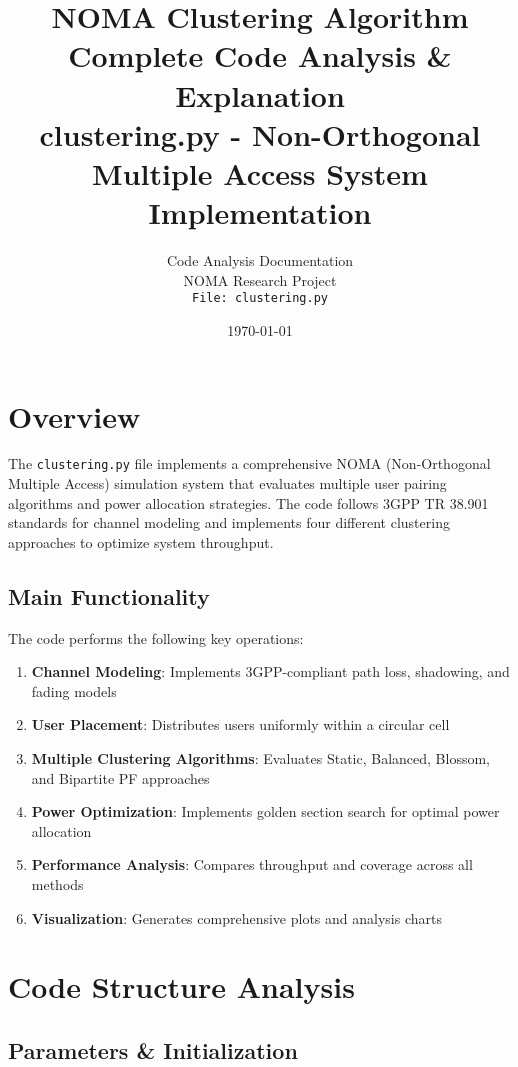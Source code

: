 \documentclass[11pt,a4paper]{article}
\title{
    {\Huge \textbf{NOMA Clustering Algorithm}} \\
    \vspace{0.5cm}
    {\Large Complete Code Analysis \& Explanation} \\
    \vspace{0.5cm}
    {\large clustering.py - Non-Orthogonal Multiple Access System Implementation}
}
\author{
    Code Analysis Documentation \\
    NOMA Research Project \\
    \texttt{File: clustering.py}
}
\date{\today}
\begin{document}
\maketitle
\newpage

\tableofcontents
\newpage

\section{Overview}

The \texttt{clustering.py} file implements a comprehensive NOMA (Non-Orthogonal Multiple Access) simulation system that evaluates multiple user pairing algorithms and power allocation strategies. The code follows 3GPP TR 38.901 standards for channel modeling and implements four different clustering approaches to optimize system throughput.

\subsection{Main Functionality}

The code performs the following key operations:

\begin{enumerate}
    \item \textbf{Channel Modeling}: Implements 3GPP-compliant path loss, shadowing, and fading models
    \item \textbf{User Placement}: Distributes users uniformly within a circular cell
    \item \textbf{Multiple Clustering Algorithms}: Evaluates Static, Balanced, Blossom, and Bipartite PF approaches
    \item \textbf{Power Optimization}: Implements golden section search for optimal power allocation
    \item \textbf{Performance Analysis}: Compares throughput and coverage across all methods
    \item \textbf{Visualization}: Generates comprehensive plots and analysis charts
\end{enumerate}

\section{Code Structure Analysis}

\subsection{Parameters \& Initialization}
\end{document}
